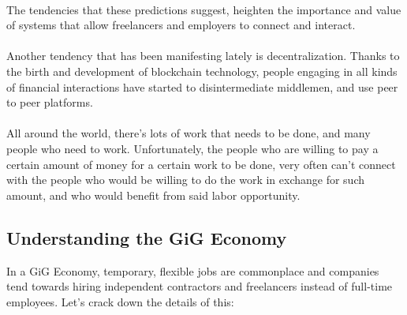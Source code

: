 \documentclass{article}
\begin{document}
\paragraph{}The tendencies that these predictions suggest, heighten the importance and value of systems that allow freelancers and employers to connect and interact.

\paragraph{}Another tendency that has been manifesting lately is decentralization. Thanks to the birth and development of blockchain technology, people engaging in all kinds of financial interactions have started to disintermediate middlemen, and use peer to peer platforms.

\paragraph{} All around the world, there's lots of work that needs to be done, and many people who need to work. Unfortunately, the people who are willing to pay a certain amount of money for a certain work to be done, very often can't connect with the people who would be willing to do the work in exchange for such amount, and who would benefit from said labor opportunity.

\subsection{Understanding the GiG Economy}
In a GiG Economy, temporary, flexible jobs are commonplace and companies tend towards hiring independent contractors and freelancers instead of full-time employees\cite{gig-economy-investopedia}. Let's crack down the details of this:
\end{document}
